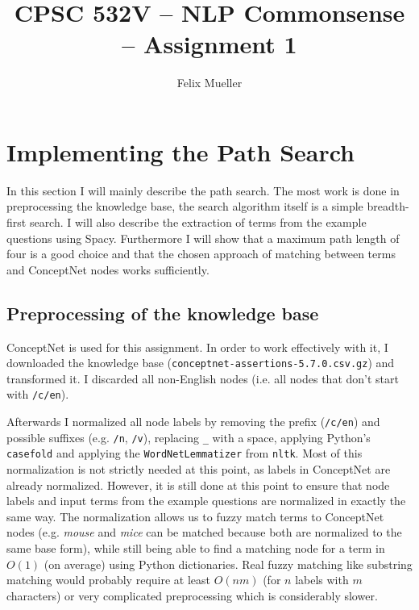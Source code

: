 \documentclass{article}
\begin{document}

\title{CPSC 532V -- NLP Commonsense -- Assignment 1}
\author{Felix Mueller}
\date{}
\maketitle

\section{Implementing the Path Search}
\label{sec:step-1:-implement}

In this section I will mainly describe the path search. The most work
is done in preprocessing the knowledge base, the search algorithm
itself is a simple breadth-first search.  I will also describe the
extraction of terms from the example questions using
Spacy. Furthermore I will show that a maximum path length of four is
a good choice and that the chosen approach of matching between terms
and ConceptNet nodes works sufficiently.

\subsection*{Preprocessing of the knowledge base}
\label{sec:prepr-knowl-base}

ConceptNet is used for this assignment. In order to work effectively
with it, I downloaded the knowledge base
(\verb`conceptnet-assertions-5.7.0.csv.gz`) and transformed it. I
discarded all non-English nodes (i.e. all nodes that don't start with
\verb`/c/en`).

Afterwards I normalized all node labels by removing the prefix
(\verb`/c/en`) and possible suffixes (e.g.  \verb`/n`, \verb`/v`),
replacing \verb`_` with a space, applying Python's \verb|casefold| and
applying the \verb`WordNetLemmatizer` from \verb`nltk`. Most of this
normalization is not strictly needed at this point, as labels in
ConceptNet are already normalized. However, it is still done at this
point to ensure that node labels and input terms from the example
questions are normalized in exactly the same way. The normalization
allows us to fuzzy match terms to ConceptNet nodes (e.g. \emph{mouse}
and \emph{mice} can be matched because both are normalized to the same
base form), while still being able to find a matching node for a term
in $O(1)$ (on average) using Python dictionaries. Real fuzzy matching
like substring matching would probably require at least $O(nm)$ (for
$n$ labels with $m$ characters) or very complicated preprocessing
which is considerably slower.
\end{document}
